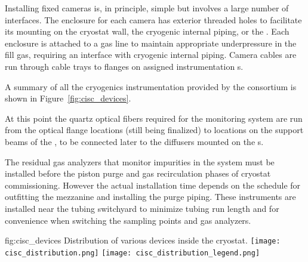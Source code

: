  
Installing fixed cameras is, in principle, simple but involves a large number of interfaces. The enclosure for each camera has exterior threaded holes to facilitate its mounting %
on the cryostat wall, the cryogenic internal piping, or the . Each enclosure is attached to a gas line to maintain appropriate underpressure in the fill gas, requiring an interface with cryogenic internal piping. Camera cables are run through cable trays to flanges on assigned instrumentation \fdth{}s. 


A summary of all the cryogenics instrumentation provided by the  consortium is shown in Figure~\ref{fig:cisc_devices}. 

At this point the quartz optical fibers required for the  monitoring system are run from the optical flange locations (still being finalized) to locations on the  support beams of the , to be connected later to the diffusers mounted on the s.


The residual gas analyzers that monitor impurities in the  system must be installed before the piston purge and gas recirculation phases of cryostat commissioning.  However the actual installation time depends on the schedule for outfitting the mezzanine and installing the   purge piping. These  instruments are installed near the tubing switchyard to minimize tubing run length and for convenience when switching the sampling points and gas analyzers. 

\begin{dunefigure}{fig:cisc_devices}
  {Distribution of various  devices inside the cryostat.
  }
  \texttt{[image: cisc\_distribution.png]}
  \texttt{[image: cisc\_distribution\_legend.png]}
\end{dunefigure}

\clearpage



